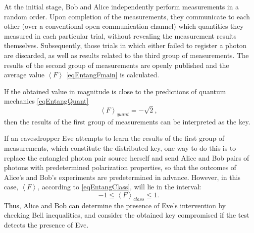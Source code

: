 At the initial stage, Bob and Alice independently perform measurements in a random order.
Upon completion of the measurements, they communicate to each other (over a conventional open communication channel) which quantities they measured in each particular trial, without revealing the measurement results themselves. Subsequently, those trials in which either failed to register a photon are discarded, as well as results related to the third group of measurements. The results of the second group of measurements are openly published and the average value $\left<F\right>$
\eqref{eqEntangFmain} is calculated.

If the obtained value in magnitude is close to the predictions of quantum
mechanics \eqref{eqEntangQuant}
\[
\left<F\right>_{quant} = - \sqrt{2},
\]
then the results of the first group of measurements can be
interpreted as the key.

If an eavesdropper Eve attempts to learn the results of the first
group of measurements, which constitute the distributed key, one way 
to do this is to replace the entangled photon pair source herself and send Alice and Bob pairs of photons
with predetermined polarization properties, so that the outcomes of Alice’s and Bob’s experiments are predetermined in advance. However, in this case,
$\left<F\right>$, according to \eqref{eqEntangClass}, will lie in the interval:
\[
-1 \le \left<F\right>_{class} \le 1.
\]
Thus, Alice and Bob can determine the presence of Eve’s intervention by checking Bell inequalities,
and consider the obtained key compromised if the test detects the presence of Eve.

